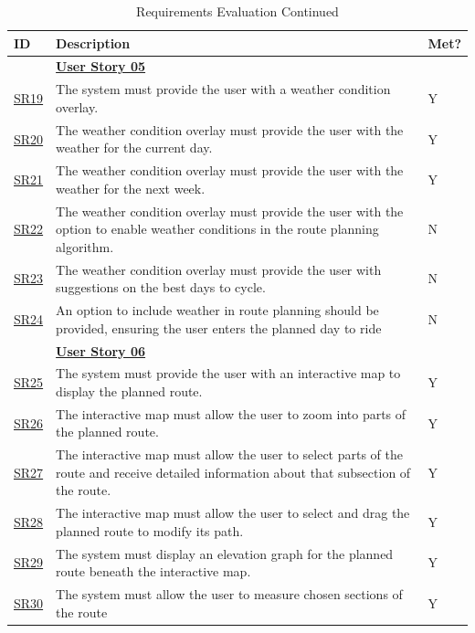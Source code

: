 \begin{table}[!htb]
    \ContinuedFloat
    \caption{Requirements Evaluation Continued}
    \label{evaluatedrqextended}
    \small
    \begin{tabularx}{\textwidth}{ p{1cm} p{11cm} p{1cm} }
        \hline
        ID & Description & Met? \\ 
        \hline
        & \textbf{\hyperref[tab:user-story-05]{User Story 05}} \\
        \hyperref[SR:19]{SR19} & The system must provide the user with a weather condition overlay. & Y \\
        \hyperref[SR:20]{SR20} & The weather condition overlay must provide the user with the weather for the current day. & Y\\
        \hyperref[SR:21]{SR21} & The weather condition overlay must provide the user with the weather for the next week. & Y\\
        \hyperref[SR:22]{SR22} & The weather condition overlay must provide the user with the option to enable weather conditions in the route planning algorithm. & N\\ 
        \hyperref[SR:23]{SR23} & The weather condition overlay must provide the user with suggestions on the best days to cycle. & N\\
        \hyperref[SR:24]{SR24} & An option to include weather in route planning should be provided, ensuring the user enters the planned day to ride & N\\ 
        \hline
        & \textbf{\hyperref[tab:user-story-06]{User Story 06}}  \\
        \hyperref[SR:25]{SR25} & The system must provide the user with an interactive map to display the planned route. & Y \\
        \hyperref[SR:26]{SR26} & The interactive map must allow the user to zoom into parts of the planned route. & Y\\
        \hyperref[SR:27]{SR27} & The interactive map must allow the user to select parts of the route and receive detailed information about that subsection of the route. & Y\\
        \hyperref[SR:28]{SR28} & The interactive map must allow the user to select and drag the planned route to modify its path. & Y\\ 
        \hyperref[SR:29]{SR29} & The system must display an elevation graph for the planned route beneath the interactive map. & Y\\
        \hyperref[SR:30]{SR30} & The system must allow the user to measure chosen sections of the route & Y\\

\end{tabularx}
\end{table}
